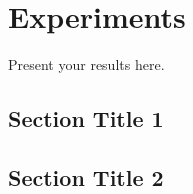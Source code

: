 \section{Experiments}\label{sec:experiments}
Present your results here. 
\subsection{Section Title 1}
\subsection{Section Title 2}



